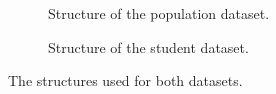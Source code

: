 
\begin{figure}[H]
	\newcommand{\figurewidth}{0.5\textwidth}
	\begin{subfigure}[b]{\figurewidth}
		\centering
				
		\caption{Structure of the population dataset.}
		\label{fig:population_dataset_structure}
	\end{subfigure}
	\begin{subfigure}[b]{\figurewidth}
		\centering
		
		\caption{Structure of the student dataset.}
		\label{fig:student_dataset_structure}
	\end{subfigure}
	\caption[Dataset structures]{The structures used for both datasets.}
	\label{fig:datasets}
\end{figure}
